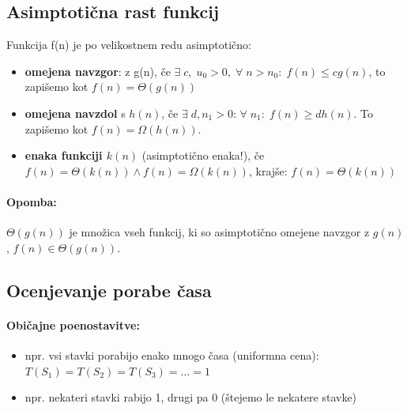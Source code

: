 \documentclass[a4paper,10pt]{article}
\begin{document}
\subsection{Asimptoti\v cna rast funkcij}
Funkcija f(n) je po velikostnem redu asimptoti\v cno:
\begin{itemize}
\item \textbf{omejena navzgor}: z g(n), \v ce $\exists\; c,\; u_0>0,\; \forall \; n>n_0:\; f(n) \leq cg(n)$, to zapi\v semo kot $f(n)=\Theta (g(n))$\\
\item \textbf{omejena navzdol} s $h(n)$, \v ce $\exists \;d, n_1>0$: $\forall \;n_1:\;f(n)\geq dh(n)$. To zapi\v semo kot $f(n) = \Omega (h(n))$.\\
\item \textbf{enaka funkciji $k(n)$} (asimptoti\v cno enaka!), \v ce $f(n) = \Theta (k(n)) \wedge f(n) = \Omega (k(n))$, kraj\v se: $f(n) = \Theta (k(n))$\\
\end{itemize}

\paragraph{Opomba:}
$\Theta (g(n))$ je mno\v zica vseh funkcij, ki so asimptoti\v cno omejene navzgor z $g(n)$, $f(n) \in \Theta (g(n))$.

\subsection{Ocenjevanje porabe \v casa}
\paragraph{Obi\v cajne poenostavitve:}
\begin{itemize}
\item npr. vsi stavki porabijo enako mnogo \v casa (uniformna cena): $T(S_1) = T(S_2) = T(S_3) = \ldots = 1$
\item npr. nekateri stavki rabijo 1, drugi pa 0 (\v stejemo le nekatere stavke)
\end{itemize}
\end{document}
